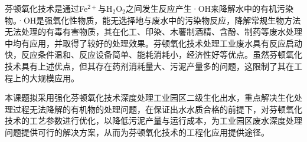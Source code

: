 芬顿氧化技术是通过Fe$^{2+}$与H$_2$O$_2$之间发生反应产生·OH来降解水中的有机污染物。·OH是强氧化性物质，能无选择地与废水中的污染物反应，降解常规生物方法无法处理的有毒有害物质，其在化工\cite{hujie_2015}、印染\cite{wangping_2015}、木薯制酒精\cite{shiqiang_2015}、含酚\cite{liyang_2017}、制药\cite{zengping_2017}等废水处理中均有应用，并取得了较好的处理效果。芬顿氧化技术处理工业废水具有反应启动快，反应条件温和、反应设备简单、能耗消耗小，经济性好等优点。虽然芬顿氧化技术具有上述优点，但其存在药剂消耗量大、污泥产量多的问题，这限制了其在工程上的大规模应用。\par
本课题拟采用强化芬顿氧化技术深度处理工业园区二级生化出水，重点解决生化处理过程无法降解的有机物的处理问题，在保证出水水质合格的前提下，对芬顿氧化技术的工艺参数进行优化，以降低污泥产量与运行成本，为工业园区废水深度处理问题提供可行的解决方案，从而为芬顿氧化技术的工程化应用提供途径。\par
